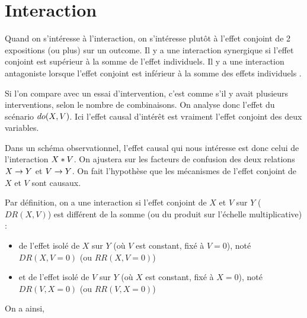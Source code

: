 \documentclass[
]{book}
\providecommand{\tightlist}{%
  \setlength{\itemsep}{0pt}\setlength{\parskip}{0pt}}
\begin{document}
\hypertarget{interaction}{%
\section{Interaction}\label{interaction}}

Quand on s'intéresse à l'interaction, on s'intéresse plutôt à l'effet conjoint de 2 expositions (ou plus) sur un outcome. Il y a une interaction synergique si l'effet conjoint est supérieur à la somme de l'effet individuels. Il y a une interaction antagoniste lorsque l'effet conjoint est inférieur à la somme des effets individuels \citet{corraini_effect_2017}.

Si l'on compare avec un essai d'intervention, c'est comme s'il y avait plusieurs interventions, selon le nombre de combinaisons. On analyse donc l'effet du scénario \(\small do(X, V)\). Ici l'effet causal d'intérêt est vraiment l'effet conjoint des deux variables.

Dans un schéma observationnel, l'effet causal qui nous intéresse est donc celui de l'interaction \(\small X*V\). On ajustera sur les facteurs de confusion des deux relations \(\small X \rightarrow Y\) et \(\small V \rightarrow Y\).
On fait l'hypothèse que les mécanismes de l'effet conjoint de \(X\) et \(V\) sont causaux.

Par définition, on a une interaction si l'effet conjoint de \(X\) et \(V\) sur \(Y\) (\(DR(X,V)\)) est différent de la somme (ou du produit sur l'échelle multiplicative) :

\begin{itemize}
\tightlist
\item
  de l'effet isolé de \(X\) sur \(Y\) (où \(V\) est constant, fixé à \(V=0\)), noté \(DR(X,V=0)\) (ou \(RR(X,V=0)\))
\item
  et de l'effet isolé de \(V\) sur \(Y\) (où \(X\) est constant, fixé à \(X=0\)), noté \(DR(V,X=0)\) (ou \(RR(V,X=0)\))
\end{itemize}

On a ainsi,
\end{document}
